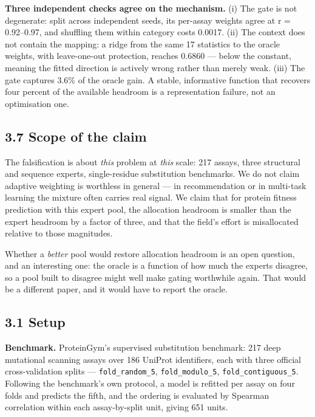 \textbf{Three independent checks agree on the mechanism.} (i) The gate is not degenerate: split across
independent seeds, its per-assay weights agree at r = 0.92--0.97, and shuffling them within category
costs 0.0017. (ii) The context does not contain the mapping: a ridge from the same 17 statistics to the
oracle weights, with leave-one-out protection, reaches 0.6860 --- below the constant, meaning the fitted
direction is actively wrong rather than merely weak. (iii) The gate captures 3.6\% of the oracle gain.
A stable, informative function that recovers four percent of the available headroom is a representation
failure, not an optimisation one.

\hypertarget{scope-of-the-claim}{%
\subsection{3.7 Scope of the claim}\label{scope-of-the-claim}}

The falsification is about \emph{this} problem at \emph{this} scale: 217 assays, three structural and sequence
experts, single-residue substitution benchmarks. We do not claim adaptive weighting is worthless in
general --- in recommendation or in multi-task learning the mixture often carries real signal. We claim
that for protein fitness prediction with this expert pool, the allocation headroom is smaller than the
expert headroom by a factor of three, and that the field's effort is misallocated relative to those
magnitudes.

Whether a \emph{better} pool would restore allocation headroom is an open question, and an interesting one:
the oracle is a function of how much the experts disagree, so a pool built to disagree might well make
gating worthwhile again. That would be a different paper, and it would have to report the oracle.

\hypertarget{setup}{%
\subsection{3.1 Setup}\label{setup}}

\textbf{Benchmark.} ProteinGym's supervised substitution benchmark: 217 deep mutational scanning assays over
186 UniProt identifiers, each with three official cross-validation splits --- \texttt{fold\_random\_5},
\texttt{fold\_modulo\_5}, \texttt{fold\_contiguous\_5}. Following the benchmark's own protocol, a model is refitted per
assay on four folds and predicts the fifth, and the ordering is evaluated by Spearman correlation
within each assay-by-split unit, giving 651 units.


